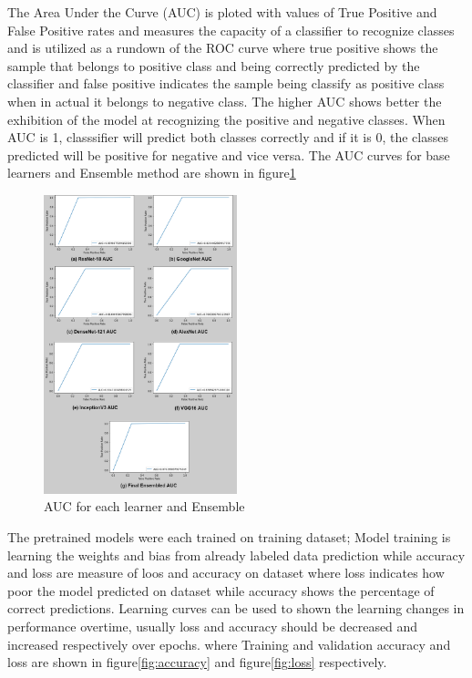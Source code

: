 \documentclass{ieeeaccess}
\begin{document}
The Area Under the Curve (AUC) is ploted with values of True Positive and False Positive rates and measures the capacity of a classifier to recognize classes and is utilized as a rundown of the ROC curve where true positive shows the sample that belongs to positive class and being correctly predicted by the classifier and false positive indicates the sample being classify as positive class when in actual it belongs to negative class. The higher AUC shows better the exhibition of the model at recognizing the positive and negative classes. When AUC is 1, classsifier will predict both classes correctly and if it is 0, the classes predicted will be positive for negative and vice versa. The AUC curves for base learners and Ensemble method are shown in figure\ref{fig:auc} 

\begin{figure}[h]
\includegraphics[width=0.5\textwidth, inner]{auc.png}
\caption{AUC for each learner and Ensemble}
\label{fig:auc}
\end{figure}
 The pretrained models were each trained on training dataset; Model training is learning the weights and bias from already labeled data prediction while accuracy and loss are measure of loos and accuracy on dataset where loss indicates how poor the model predicted on dataset while accuracy shows the percentage of correct predictions. Learning curves can be used to shown the learning changes in performance overtime, usually loss and accuracy should be decreased and increased respectively over epochs. where Training and validation accuracy and loss are shown in figure\ref{fig:accuracy} and figure\ref{fig:loss} respectively. 
\end{document}
